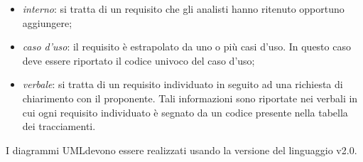 \begin{itemize}
\begin{itemize}
					\item \textit{interno}: si tratta di un requisito che gli analisti hanno ritenuto opportuno aggiungere;
					\item \textit{caso d'uso}: il requisito è estrapolato da uno o più casi d'uso. In questo caso deve essere riportato il codice univoco del caso d'uso;
					\item \textit{verbale}: si tratta di un requisito individuato in seguito ad una richiesta di chiarimento con il proponente. Tali informazioni sono riportate nei verbali in cui ogni requisito individuato è segnato da un codice presente nella tabella dei tracciamenti.
				\end{itemize}
			\end{itemize}

			 \newline \newline
			I diagrammi UML\glosp devono essere realizzati usando la versione del linguaggio v2.0.

